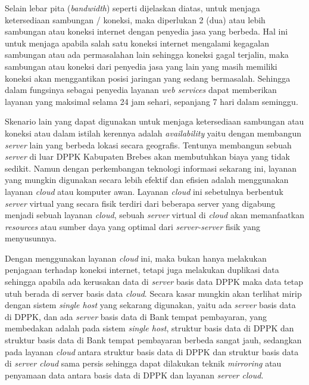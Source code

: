 \documentclass[pdftex,12pt, oneside]{article}
\begin{document}
\begin{enumerate}
Selain lebar pita (\textit{bandwidth}) seperti dijelaskan diatas, untuk menjaga ketersediaan sambungan / koneksi, maka diperlukan 2 (dua) atau lebih sambungan atau koneksi internet dengan penyedia jasa yang berbeda. Hal ini untuk menjaga apabila salah satu koneksi internet mengalami kegagalan sambungan atau ada permasalahan lain sehingga koneksi gagal terjalin, maka sambungan atau koneksi dari penyedia jasa yang lain yang masih memiliki koneksi akan menggantikan posisi jaringan yang sedang bermasalah. Sehingga dalam fungsinya sebagai penyedia layanan \textit{web services} dapat memberikan layanan yang maksimal selama 24 jam sehari, sepanjang 7 hari dalam seminggu.

Skenario lain yang dapat digunakan untuk menjaga ketersediaan sambungan atau koneksi atau dalam istilah kerennya adalah \textit{availability} yaitu dengan membangun \textit{server} lain yang berbeda lokasi secara geografis. Tentunya membangun sebuah \textit{server} di luar DPPK Kabupaten Brebes akan membutuhkan biaya yang tidak sedikit. Namun dengan perkembangan teknologi informasi sekarang ini, layanan yang mungkin digunakan secara lebih efektif dan efisien adalah menggunakan layanan \textit{cloud} atau komputer awan. Layanan \textit{cloud} ini sebetulnya berbentuk \textit{server} virtual yang secara fisik terdiri dari beberapa server yang digabung menjadi sebuah layanan \textit{cloud}, sebuah \textit{server} virtual di \textit{cloud} akan memanfaatkan \textit{resources} atau sumber daya yang optimal dari \textit{server-server} fisik yang menyusunnya.

Dengan menggunakan layanan \textit{cloud} ini, maka bukan hanya melakukan penjagaan terhadap koneksi internet, tetapi juga melakukan duplikasi data sehingga apabila ada kerusakan data di \textit{server} basis data DPPK maka data tetap utuh berada di server basis data \textit{cloud}. Secara kasar mungkin akan terlihat mirip dengan sistem \textit{single host} yang sekarang digunakan, yaitu ada \textit{server} basis data di DPPK, dan ada \textit{server} basis data di Bank tempat pembayaran, yang membedakan adalah pada sistem \textit{single host}, struktur basis data di DPPK dan struktur basis data di Bank tempat pembayaran berbeda sangat jauh, sedangkan pada layanan \textit{cloud} antara struktur basis data di DPPK dan struktur basis data di \textit{server cloud} sama persis sehingga dapat dilakukan teknik \textit{mirroring} atau penyamaan data antara basis data di DPPK dan layanan \textit{server cloud}.

\end{enumerate}
\end{document}
